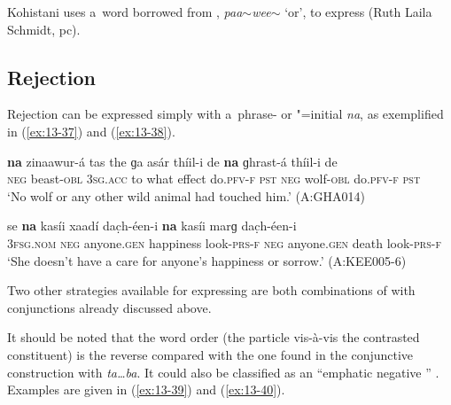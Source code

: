 Kohistani \iliShina uses a~word borrowed from \iliPunjabi, \textit{paa$\sim$wee$\sim$} `or', to express  (Ruth Laila Schmidt, pc).


\subsection{Rejection}
\label{subsec:13-2-4}

 Rejection can be expressed simply with a~phrase- or "=initial  \textit{na}, as exemplified in (\ref{ex:13-37}) and (\ref{ex:13-38}).

\begin{exe}
\ex
\label{ex:13-37}
\gll \textbf{na} zinaawur-á tas the ɡa asár thíil-i de \textbf{na} ɡhrast-á thíil-i de \\
\textsc{neg} beast-\textsc{obl} \textsc{3sg.acc} to what effect do.\textsc{pfv-f} \textsc{pst}  \textsc{neg} wolf-\textsc{obl} do.\textsc{pfv-f} \textsc{pst} \\
\glt `No wolf or any other wild animal had touched him.' (A:GHA014)

\ex
\label{ex:13-38}
\gll se {\ob}\textbf{na} kasíi xaadí dac̣h-éen-i \textbf{na} kasíi marɡ dac̣h-éen-i{\cb}\\
\textsc{3fsg.nom} \textsc{neg} anyone.\textsc{gen} happiness look-\textsc{prs-f}  \textsc{neg} anyone.\textsc{gen} death look-\textsc{prs-f}  \\
\glt `She doesn't have a care for anyone's happiness or sorrow.' (A:KEE005-6) 
\end{exe}

Two other strategies available for expressing  are both combinations of  with conjunctions already discussed above.


 It should be noted that the word order (the particle vis-à-vis the contrasted constituent) is the reverse compared with the one found in the conjunctive construction with \textit{ta{\ldots}ba}. It could also be classified as an ``emphatic negative '' \citep[17--19]{haspelmath2007}. Examples are given in (\ref{ex:13-39}) and (\ref{ex:13-40}).

